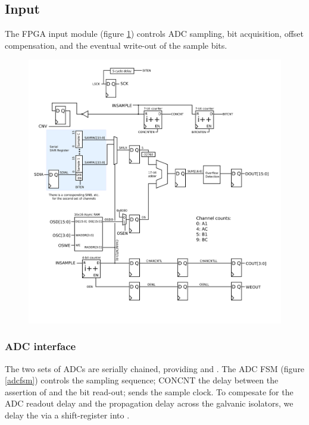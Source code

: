 \subsection{Input}

The FPGA input module (figure \ref{input}) controls ADC sampling, bit acquisition, offset compensation, and the eventual write-out of the sample bits. 

\begin{figure}[h!]
\begin{centering}
\label{input}
\includegraphics[scale=0.7]{input.svg}
\end{centering}
\end{figure}


\subsubsection{ADC interface}
The two sets of ADCs are serially chained, providing  and . The ADC FSM (figure \ref{adcfsm}) controls the sampling sequence; CONCNT the delay between the assertion of  and the bit read-out;  sends the sample clock. To compesate for the ADC readout delay and the propagation delay across the galvanic isolators, we delay the  via a shift-register into . 

